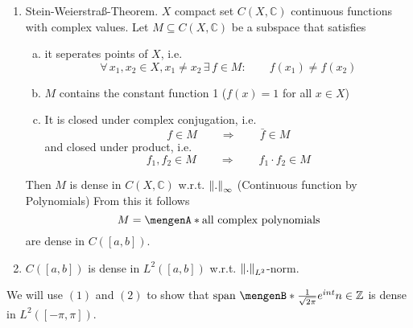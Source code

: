 \begin{enumerate}[(1)]
	\item Stein-Weierstraß-Theorem. $X$ compact set $C(X,\mathbb{C})$ continuous functions with complex values. Let $M \subseteq C(X,\mathbb{C})$ be a subspace that satisfies
	\begin{enumerate}[(a)]
		\item it seperates points of $X$, i.e. 
		\[
			\forall\, x_1,x_2 \in X, x_1 \neq x_2 \,\exists\, f \in M: \qquad f(x_1) \neq f(x_2)
		\]
		\item $M$ contains the constant function 1 ($f(x)= 1$ for all $x \in X$)
		\item It is closed under complex conjugation, i.e. 
		\[
			f \in M \qquad \Rightarrow \qquad \bar{f} \in M
		\]
		and closed under product, i.e.
		\[
			f_1,f_2 \in M \qquad \Rightarrow \qquad f_1 \cdot f_2 \in M
		\]
	\end{enumerate}
	Then $M$ is dense in $C(X,\mathbb{C})$ w.r.t. $\norm{.}_{\infty}$ (Continuous function by Polynomials) From this it follows
	\[
		M = \set{ \text{all complex polynomials}}
	\]
	are dense in $C([a,b])$.
	\item $C([a,b])$ is dense in $L^2([a,b])$ w.r.t. $\norm{.}_{L^2}$-norm. 
\end{enumerate}
We will use $(1)$ and $(2)$ to show that $\text{span }\set[\frac{1}{\sqrt{2 \pi}}e^{int}]{n \in \mathbb{Z}}$ is dense in $L^2([-\pi,\pi])$.
